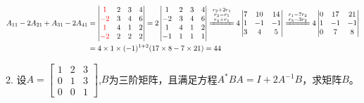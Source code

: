 \documentclass{article}
\begin{document}
\begin{jie}
\begin{align*}
A_{11}-2A_{21}+A_{31}-2A_{41}&=
\begin{vmatrix}
  \textcolor[rgb]{1.00,0.00,0.00}{1} & 2 & 3 & 4 \\
  \textcolor[rgb]{1.00,0.00,0.00}{-2} & 3 & 4 & 6 \\
  \textcolor[rgb]{1.00,0.00,0.00}{1} & 4 & 1 & 2 \\
  \textcolor[rgb]{1.00,0.00,0.00}{-2}  & 2 & 2 & 2
\end{vmatrix}=2
\begin{vmatrix}
  1 & 2 & 3 & 4 \\
  -2 & 3 & 4 & 6 \\
  1 & 4 & 1 & 2 \\
  -1 & 1 & 1 & 1
\end{vmatrix}\xlongequal{\substack{r_2+2r_1\\ r_3-r_1\\ r_4+r_1}}4\begin{vmatrix}
 7 & 10& 14 \\
1 & -1 & -1 \\
 3& 4 & 5
\end{vmatrix}\xlongequal{\substack{r_1-7r_2\\ r_3-3r_2}}4\begin{vmatrix}
 0 & 17& 21 \\
1 & -1 & -1 \\
 0& 7 & 8
\end{vmatrix}\\
& =4\times1\times(-1)^{1+2}(17\times8-7\times21)=44
\end{align*}
\end{jie}
2. 设$
A=
\begin{bmatrix}
  1 & 2 & 3 \\
  0 & 1 & 3\\
  0 & 0 & 1
\end{bmatrix}
$,$B$为三阶矩阵，且满足方程$A^{*}BA=I+2A^{-1}B$，求矩阵$B$。
\end{document}
